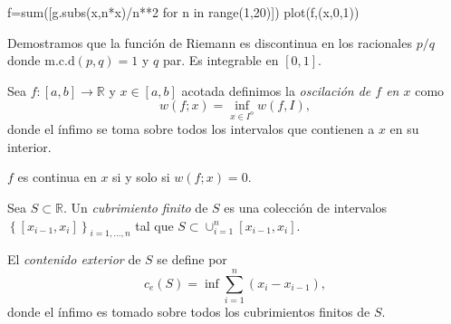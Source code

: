 \begin{ejemplo}
\begin{sympyverbatim}
f=sum([g.subs(x,n*x)/n**2 for n in range(1,20)])
plot(f,(x,0,1))
\end{sympyverbatim}
 
Demostramos que la función de Riemann es discontinua en los racionales $p/q$ donde $\text{m.c.d}(p,q)=1$ y $q$ par. Es integrable en $[0,1]$.  
 
\end{ejemplo}


\begin{definicion} 
Sea $f:[a,b]\to\mathbb{R}$ y $x\in [a,b]$ 
acotada definimos la {\em oscilación de $f$ en $x$} como 
\[
 w(f;x)=\inf\limits_{x\in I^o}w(f,I),
\]
donde el ínfimo se toma sobre todos los intervalos que contienen a $x$ en su interior.
\end{definicion}

\begin{ejercicio} $f$ es continua en $x$ si y solo si $w(f;x)=0$.
 \end{ejercicio}

 \begin{definicion} Sea $S\subset\mathbb{R}$. Un \emph{cubrimiento finito} de $S$ es una colección de intervalos $\left\{ [x_{i-1},x_i]\right\}_{i=1,\ldots,n}$ tal que $S\subset \cup_{i=1}^n[x_{i-1},x_i]$.
 
 El \emph{contenido exterior} de $S$ se define por 
 \[
  c_e(S)=\inf \sum_{i=1}^n (x_i-x_{i-1}),
 \]
donde el ínfimo es tomado sobre todos los cubrimientos finitos de $S$.
  
 \end{definicion}
 
